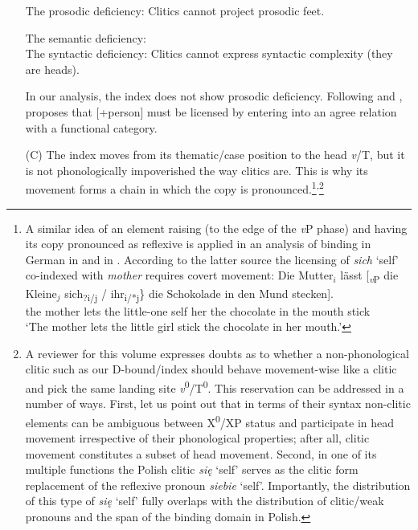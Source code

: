\documentclass[output=paper,modfonts,nonflat
]{langsci/langscibook}
\begin{document}
\begin{itemize}
{%
\ea
The prosodic deficiency: Clitics cannot project prosodic feet. \citep[147]{franks2017}
\z

\ea
The semantic deficiency:\\
\z
\z
\ea
The syntactic deficiency: Clitics cannot express syntactic complexity (they are heads).
\z

\noindent In our analysis, the index does not show prosodic deficiency. Following \cite{cardinalettistarke1994} and \cite{bejar2003}, \cite{franks2017} proposes that [+person] must be licensed by entering into an agree relation with a functional category.}

    \item[(C)] The index moves from its thematic/case position to the head \textit{v}/T, but it is not phonologically impoverished the way clitics are. This is why its movement forms a chain in which the copy is pronounced.\footnote{\label{fn7}A similar idea of an element raising (to the edge of the \textit{v}P phase) and having its copy pronounced as reflexive is applied in an analysis of binding in German in \cite{safir2004} and in \cite[291]{leeschoenfeld2008}. According to the latter source the licensing of \textit{sich} ‘self’ co-indexed with \textit{mother} requires covert movement:
\ea
\gll Die Mutter$_i$ lässt [\textsubscript{\textit{v}P} die Kleine$_j$ \minsp{\{} sich\textsubscript{?i/j} / ihr\textsubscript{i/*j}\} die Schokolade in den Mund stecken].\\
the mother lets {} the little-one {} self {} her the chocolate in the mouth stick\\
\glt `The mother lets the little girl stick the chocolate in her mouth.’
\z}\textsuperscript{,}\footnote{\label{fn8}A reviewer for this volume expresses doubts as to whether a non-phonological clitic such as our D-bound/index should behave movement-wise like a clitic and pick the same landing site \textit{v}\textsuperscript{0}/T\textsuperscript{0}. This reservation can be addressed in a number of ways. First, let us point out that in terms of their syntax non-clitic elements can be ambiguous between X\textsuperscript{0}/XP status and participate in head movement irrespective of their phonological properties; after all, clitic movement constitutes a subset of head movement. Second, in one of its multiple functions the Polish clitic \textit{się} ‘self’ serves as the clitic form replacement of the reflexive pronoun \textit{siebie} ‘self’. Importantly, the distribution of this type of \textit{się} ‘self’ fully overlaps with the distribution of clitic/weak pronouns and the span of the binding domain in Polish.

}
\end{itemize}
\end{document}
